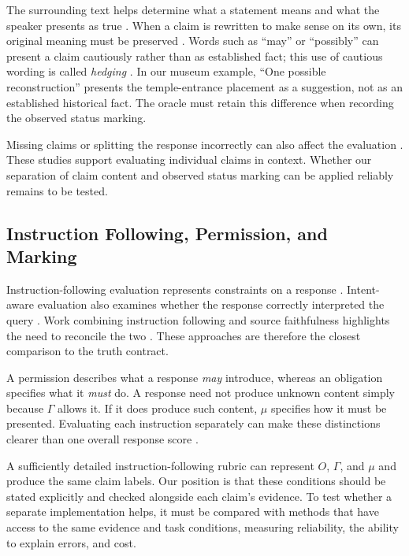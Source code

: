 \documentclass{clv2025}
\begin{document}
The surrounding text helps determine what a statement means and what the
speaker presents as true \citep{stalnaker_assertion_1978,clark_using_1996}.
When a claim is rewritten to make sense on its own, its original meaning
must be preserved \citep{choi_decontextualization_2021}. Words such as
``may'' or ``possibly'' can present a claim cautiously rather than as
established fact; this use of cautious wording is called \emph{hedging}
\citep{hyland_hedging_1996}. In our museum example, ``One possible
reconstruction'' presents the temple-entrance placement as a suggestion,
not as an established historical fact. The oracle must retain this
difference when recording the observed status marking.

Missing claims or splitting the response incorrectly can also affect the
evaluation
\citep{wanner_closer_2024,metropolitansky_claimify_2025}.
These studies support evaluating individual claims in context. Whether our
separation of claim content and observed status marking can be applied
reliably remains to be tested.

\subsection{Instruction Following, Permission, and Marking}

Instruction-following evaluation represents constraints on a response
\citep{zhou_ifeval_2023,ye_muldimif_2025}. Intent-aware evaluation also examines
whether the response correctly interpreted the query
\citep{hao_faithqa_2025}. Work combining instruction following and source
faithfulness highlights the need to reconcile the two
\citep{wu_dancing_2024}. These approaches are therefore the closest comparison
to the truth contract.

A permission describes what a response \emph{may} introduce, whereas an
obligation specifies what it \emph{must} do. A response need not produce
unknown content simply because $\Gamma$ allows it. If it does produce such
content, $\mu$ specifies how it must be presented. Evaluating each instruction
separately can make these distinctions clearer than one overall response score
\citep{lee_mcjudgebench_2026}.

A sufficiently detailed instruction-following rubric can represent $O$,
$\Gamma$, and $\mu$ and produce the same claim labels. Our position is that
these conditions should be stated explicitly and checked alongside each
claim's evidence. To test whether a separate implementation helps, it must
be compared with methods that have access to the same evidence and task
conditions, measuring reliability, the ability to explain errors, and cost.
\end{document}
